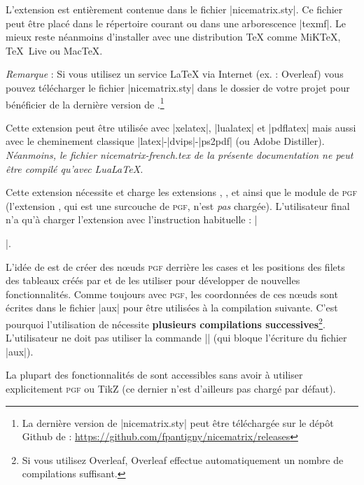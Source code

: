 \documentclass[dvipsnames]{article}%
\begin{document}
\vspace{1cm}

L'extension  est entièrement contenue dans le fichier |nicematrix.sty|. Ce fichier peut être placé
dans le répertoire courant ou dans une arborescence |texmf|. Le mieux reste néanmoins d'installer 
avec une distribution TeX comme MiKTeX, TeX~Live ou MacTeX.

\medskip
\emph{Remarque} : Si vous utilisez un service LaTeX via Internet (ex. :
Overleaf) vous pouvez télécharger le fichier |nicematrix.sty| dans le dossier de
votre projet pour bénéficier de la dernière version de
.\footnote{La dernière version de |nicematrix.sty| peut
  être téléchargée sur le dépôt Github de  : \newline \small
  \url{https://github.com/fpantigny/nicematrix/releases}}

\medskip
Cette extension peut être utilisée avec |xelatex|, |lualatex| et |pdflatex| mais
aussi avec le cheminement classique |latex|-|dvips|-|ps2pdf| (ou Adobe
Distiller). \textsl{Néanmoins, le fichier nicematrix-french.tex de la présente
  documentation ne peut être compilé qu'avec LuaLaTeX.}

\medskip
Cette extension nécessite et charge les extensions , ,
 et  ainsi que le module  de \textsc{pgf}
(l'extension , qui est une surcouche de \textsc{pgf}, n'est \emph{pas}
chargée). L'utilisateur final n'a qu'à charger l'extension  avec
l'instruction habituelle : |\usepackage{nicematrix}|.


\medskip
L'idée de  est de créer des nœuds \textsc{pgf} derrière les
cases et les positions des filets des tableaux créés par  et de les
utiliser pour développer de nouvelles fonctionnalités. Comme toujours avec
\textsc{pgf}, les coordonnées de ces nœuds sont écrites dans le fichier |aux|
pour être utilisées à la compilation suivante. C'est pourquoi l'utilisation de
 nécessite \textbf{plusieurs compilations
  successives}\footnote{Si vous utilisez Overleaf, Overleaf effectue
  automatiquement un nombre de compilations suffisant.}. L'utilisateur ne doit
pas utiliser la commande |\nofiles| (qui bloque l'écriture du fichier |aux|). 

\medskip
La plupart des fonctionnalités de  sont accessibles sans avoir à
utiliser explicitement \textsc{pgf} ou TikZ (ce dernier n'est d'ailleurs pas
chargé par défaut).
\end{document}
